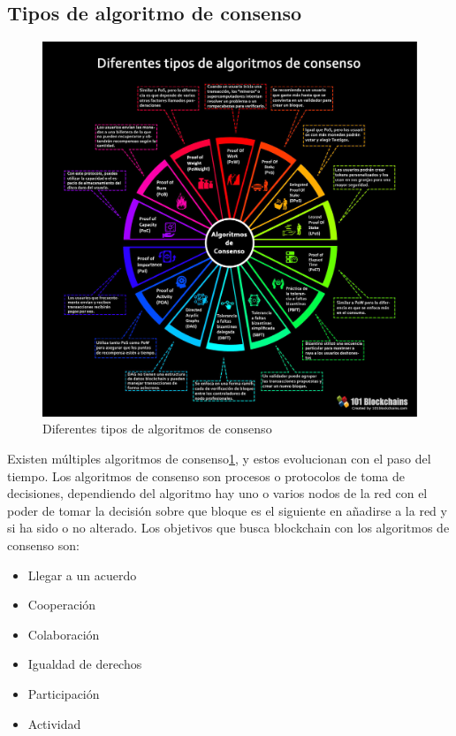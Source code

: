 \subsection{Tipos de algoritmo de consenso}

\begin{figure}[h!]
  \centering
  \includegraphics[width=0.8\linewidth]{figs/EstadoArte/Blockchain/algoritmosConsenso.jpeg}
  \caption[Algoritmos de Consenso]{Diferentes tipos de algoritmos de consenso}
  \label{fig:consenso}
\end{figure}

Existen múltiples algoritmos de consenso\ref{fig:consenso}, y estos evolucionan con el paso del tiempo. Los algoritmos de consenso son procesos o protocolos de toma de decisiones, dependiendo del algoritmo hay uno o varios nodos de la red con el poder de tomar la decisión sobre que bloque es el siguiente en añadirse a la red y si ha sido o no alterado. Los objetivos que busca blockchain con los algoritmos de consenso son:

\begin{itemize}
\item Llegar a un acuerdo
\item Cooperación
\item Colaboración
\item Igualdad de derechos
\item Participación
\item Actividad
\end{itemize}

